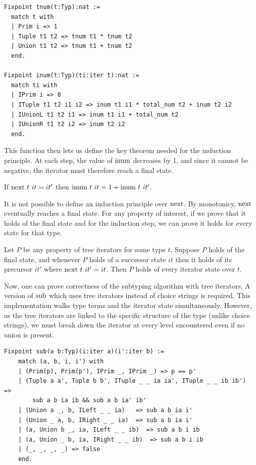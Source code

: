 \documentclass[a4paper,english]{lipics-v2019}
\renewcommand{\c}[1]{\ensuremath{\text{\lstinline{#1}}}\xspace}
\begin{document}
\newpage

\begin{lstlisting}
Fixpoint tnum(t:Typ):nat :=
  match t with
  | Prim i => 1
  | Tuple t1 t2 => tnum t1 * tnum t2
  | Union t1 t2 => tnum t1 + tnum t2
  end.

Fixpoint inum(t:Typ)(ti:iter t):nat :=
  match ti with
  | IPrim i => 0
  | ITuple t1 t2 i1 i2 => inum t1 i1 * total_num t2 + inum t2 i2
  | IUnionL t1 t2 i1 => inum t1 i1 + total_num t2
  | IUnionR t1 t2 i2 => inum t2 i2
  end.
\end{lstlisting}

\noindent This function then lets us define the key theorem needed for the
induction principle. At each step, the value of \c{inum} decreases by 1, and
since it cannot be negative, the iterator must therefore reach a final
state.

\begin{lemma}[Monotonicity]\label{inum_mono}
If $\c{next}~t~it = it'$ then $\c{inum}~t~it = 1 + \c{inum}~t~it'$.
\end{lemma}

\noindent
It is not possible to define an induction principle over \c{next}. By
monotonicy, \c{next} eventually reaches a final state.  For any property
of interest, if we prove that it holds of the final state and for the
induction step, we can prove it holds for every state for that type.

\begin{theorem}\label{indprop}
Let $P$ be any property of tree iterators for some type $t$.  Suppose $P$
holds of the final state, and whenever $P$ holds of a successor state $it$
then it holds of its precursor $it'$ where $\c{next}~t~it' = it$.  Then $P$
holds of every iterator state over $t$.
\end{theorem} 

\noindent
Now, one can prove correctness of the subtyping algorithm with tree
iterators.  A version of \c{sub} which uses tree iterators instead of choice
strings is required.  This implementation walks type terms and the iterator
state simultaneously. However, as the tree iterators are linked to the
specific structure of the type (unlike choice strings), we must break down
the iterator at every level encountered even if no union is present.

\begin{lstlisting}
Fixpoint sub(a b:Typ)(i:iter a)(i':iter b) :=
    match (a, b, i, i') with
    | (Prim(p), Prim(p'), IPrim _, IPrim _) => p == p'
    | (Tuple a a', Tuple b b', ITuple _ _ ia ia', ITuple _ _ ib ib') =>
        sub a b ia ib && sub a b ia' ib'
    | (Union a _, b, ILeft _ _ ia)   => sub a b ia i'
    | (Union _ a, b, IRight _ _ ia)  => sub a b ia i'
    | (a, Union b _, ia, ILeft _ _ ib)  => sub a b i ib
    | (a, Union _ b, ia, IRight _ _ ib)  => sub a b i ib
    | (_, _, _, _) => false
    end.
\end{lstlisting}
\end{document}
